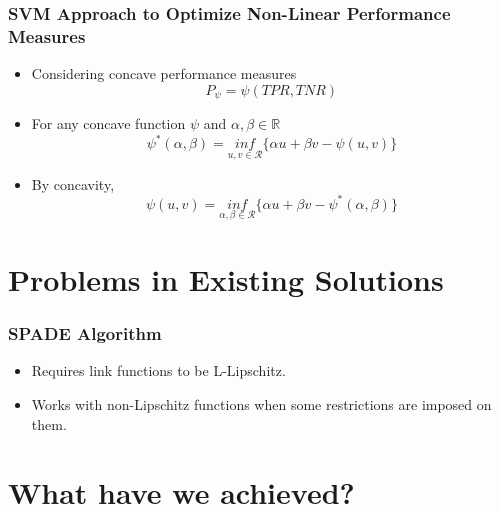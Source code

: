 \documentclass{beamer}
\begin{document}
\begin{frame}
	\frametitle{SVM Approach to Optimize Non-Linear Performance Measures}
	\begin{itemize}
		\item Considering concave performance measures
		\begin{equation*}
		P_\psi = \psi(TPR,TNR)
		\end{equation*}
		\item For any concave function $\psi$ and $\alpha, \beta \in \mathbb{R}$
		\begin{equation*}
			\psi^*(\alpha, \beta) = \underset{u,v\in\mathcal{R}}{inf}\{\alpha u + \beta v - \psi(u,v)\}
		\end{equation*}
		\item By concavity,
		\begin{equation*}
		\psi(u,v) = \underset{\alpha,\beta\in\mathcal{R}}{inf}\{\alpha u + \beta v - \psi^*(\alpha, \beta)\}
		\end{equation*}
	\end{itemize}
\end{frame}


\section{Problems in Existing Solutions} %

\begin{frame}
	\frametitle{SPADE Algorithm}
	\begin{itemize}
		\item Requires link functions to be L-Lipschitz.
		\item Works with non-Lipschitz functions when some restrictions are imposed on them.
	\end{itemize}
\end{frame}


\section{What have we achieved?} %
\end{document}
